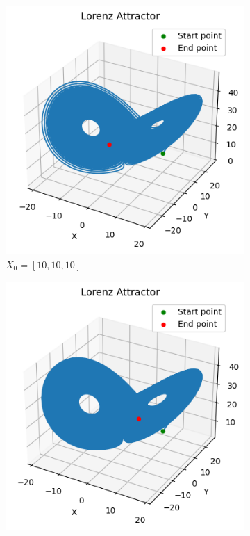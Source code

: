\begin{itemize}
\begin{figure}[H]
    \centering
    \begin{subfigure}[b]{0.45\textwidth}
        \centering
        \includegraphics[width=\textwidth]{images/ex4task4_lorenz_1.png}
        \caption{$X_0=[10,10,10]$}
        \label{fig:lorenz_1}
    \end{subfigure}
    \begin{subfigure}[b]{0.45\textwidth}
        \centering
        \includegraphics[width=\textwidth]{images/ex4_task4_lorenz_2.png}

\end{subfigure}
\end{figure}
\end{itemize}
